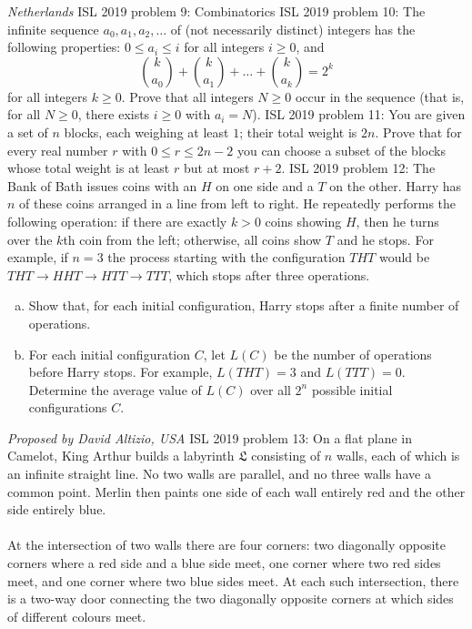 \textit{Netherlands} 
ISL 2019 problem 9:  Combinatorics 
ISL 2019 problem 10:  The infinite sequence $a_0,a _1, a_2, \dots$ of (not necessarily distinct) integers has the following properties: $0\le a_i \le i$ for all integers $i\ge 0$, and
\[ \binom{k}{a_0} + \binom{k}{a_1} + \dots + \binom{k}{a_k} = 2^k \]
for all integers $k\ge 0$. Prove that all integers $N\ge 0$ occur in the sequence (that is, for all $N\ge 0$, there exists $i\ge 0$ with $a_i=N$). 
ISL 2019 problem 11:  You are given a set of $n$ blocks, each weighing at least $1$; their total weight is $2n$. Prove that for every real number $r$ with $0 \leq r \leq 2n-2$ you can choose a subset of the blocks whose total weight is at least $r$ but at most $r + 2$. 
ISL 2019 problem 12:  The Bank of Bath issues coins with an $H$ on one side and a $T$ on the other. Harry has $n$ of these coins arranged in a line from left to right. He repeatedly performs the following operation: if there are exactly $k>0$ coins showing $H$, then he turns over the $k$th coin from the left; otherwise, all coins show $T$ and he stops. For example, if $n=3$ the process starting with the configuration $THT$ would be $THT \to HHT  \to HTT \to TTT$, which stops after three operations.
\begin{enumerate}[(a)]
  \item Show that, for each initial configuration, Harry stops after a finite number of operations.
  \item For each initial configuration $C$, let $L(C)$ be the number of operations before Harry stops. For example, $L(THT) = 3$ and $L(TTT) = 0$. Determine the average value of $L(C)$ over all $2^n$ possible initial configurations $C$.
\end{enumerate}
\textit{Proposed by David Altizio, USA} 
ISL 2019 problem 13:  On a flat plane in Camelot, King Arthur builds a labyrinth $\mathfrak{L}$ consisting of $n$ walls, each of which is an infinite straight line. No two walls are parallel, and no three walls have a common point. Merlin then paints one side of each wall entirely red and the other side entirely blue. \\\\
At the intersection of two walls there are four corners: two diagonally opposite corners where a red side and a blue side meet, one corner where two red sides meet, and one corner where two blue sides meet. At each such intersection, there is a two-way door connecting the two diagonally opposite corners at which sides of different colours meet. \\\\
